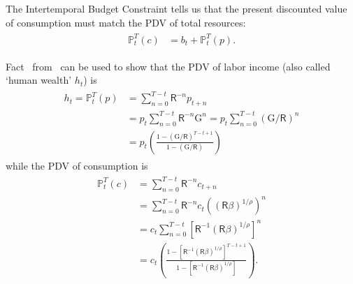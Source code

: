 \documentclass{scrartcl}
\begin{document}
The Intertemporal Budget Constraint tells us that the present discounted 
value of consumption must match the PDV of total resources:
\begin{equation}\begin{gathered}\begin{aligned}
        {\mathbb{P}}_{t}^{T}(\boldsymbol{\mathit{c}}) & =  \boldsymbol{\mathit{b}}_{t}+{\mathbb{P}}_{t}^{T}(\boldsymbol{\mathit{p}}).
        \label{eq:ibc}
\end{aligned}\end{gathered}\end{equation}

Fact \FinSum~from \MathFactsList~can be used to show that the PDV of labor income (also called `human wealth'
$\boldsymbol{\mathit{h}}_{t}$) is
\begin{equation}\begin{gathered}\begin{aligned}
        \boldsymbol{\mathit{h}}_{t} = {\mathbb{P}}_{t}^{T}(\boldsymbol{\mathit{p}}) & =  \sum_{n=0}^{T-t} \mathsf{R}^{-n}\boldsymbol{\mathit{p}}_{t+n}
\\       & =  \boldsymbol{\mathit{p}}_{t}\sum_{n=0}^{T-t} \mathsf{R}^{-n}{\ensuremath{\mathrm{G}}}^{n} = \boldsymbol{\mathit{p}}_{t}\sum_{n=0}^{T-t} ({\ensuremath{\mathrm{G}}}/\mathsf{R})^{n}
\\   & =  \boldsymbol{\mathit{p}}_{t}\left(\frac{1-({\ensuremath{\mathrm{G}}}/\mathsf{R})^{T-t+1}}{1-({\ensuremath{\mathrm{G}}}/\mathsf{R})}\right)    \label{eq:yfin}
\end{aligned}\end{gathered}\end{equation}
while the PDV of consumption is
\begin{equation}\begin{gathered}\begin{aligned}
        {\mathbb{P}}_{t}^{T}(\boldsymbol{\mathit{c}}) & =  \sum_{n=0}^{T-t} \mathsf{R}^{-n}\boldsymbol{\mathit{c}}_{t+n}
\\       & =  \sum_{n=0}^{T-t} \mathsf{R}^{-n}\boldsymbol{\mathit{c}}_{t}((\mathsf{R}\beta)^{1/\rho})^{n}
\\       & =  \boldsymbol{\mathit{c}}_{t} \sum_{n=0}^{T-t} [\mathsf{R}^{-1}(\mathsf{R}\beta)^{1/\rho}]^{n}
\\   & =  \boldsymbol{\mathit{c}}_{t}\left(\frac{1-[\mathsf{R}^{-1}(\mathsf{R}\beta)^{1/\rho}]^{T-t+1}}{1-[\mathsf{R}^{-1}(\mathsf{R}\beta)^{1/\rho}]}\right) \label{eq:cfin}.
\end{aligned}\end{gathered}\end{equation}
\end{document}
